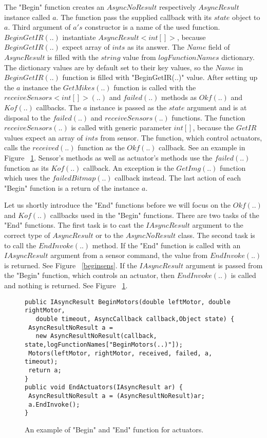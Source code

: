 	The "Begin" function creates an $AsyncNoResult$ respectively $AsyncResult$ instance called $a$. 
	The function pass the supplied callback with its $state$ object to
	$a$. Third argument of $a's$ constructor is a name of the used function.
	$BeginGetIR(..)$ instantiate $AsyncResult<int[]>$, because $BeginGetIR(..)$
	expect array of $ints$ as its answer. 
	The $Name$ field of $AsyncResult$ is filled with the $string$ value from $logFunctionNames$ dictionary. 
	The dictionary values are by default set to their key values, so
	the $Name$ in $BeginGetIR(..)$ function is filled with "BeginGetIR(..)" value.
	After setting up the $a$ instance the $GetMikes(..)$ function is called with the $receiveSensors<int[]>(..)$ and 
	$failed(..)$ methods as $Okf(..)$ and $Kof(..)$ callbacks.
	The $a$ instance is passed as the $state$ argument and is at disposal to the $failed(..)$ and 
	$receiveSensors(..)$ functions.
	The function $receiveSensors(..)$ is called with generic parameter $int[]$, 
	because the $GetIR$ values expect an array of $ints$ from sensor.
	The function, which control actuators, calls the $received(..)$ function as the $Okf(..)$ callback. 
	See an example in Figure ~\ref{beginact}.
	Sensor's methods as well as actuator's methods use the $failed(..)$ function as its $Kof(..)$ callback.
	An exception is the $GetImg(..)$ function which uses the $failedBitmap(..)$ callback instead.
	The last action of each "Begin" function is a return of the instance $a$.

	Let us shortly introduce the "End" functions before we will focus on the $Okf(..)$ and 
	$Kof(..)$ callbacks used in the "Begin" functions.
	There are two tasks of the "End" functions.
	The first task  is to cast the $IAsyncResult$ argument to the correct type of $AsyncResult$ 
	or to the $AsyncNoResult$ class. The second task is to call the $EndInvoke(..)$ method.
	If the "End" function is called with an $IAsyncResult$ argument from a sensor command, 
	the value from $EndInvoke(..)$ is returned. See Figure ~\ref{beginsens}. 
	If the $IAsyncResult$ argument is passed from the "Begin" function, 
	which controls an actuator, then $EndInvoke(..)$ is called and nothing is returned. See Figure ~\ref{beginact}.
	
\begin{figure}[!hbp]
\begin{lstlisting}
public IAsyncResult BeginMotors(double leftMotor, double rightMotor, 
   double timeout, AsyncCallback callback,Object state) {
 AsyncResultNoResult a = 
   new AsyncResultNoResult(callback, state,logFunctionNames["BeginMotors(..)"]);
 Motors(leftMotor, rightMotor, received, failed, a, timeout);
 return a;
}
public void EndActuators(IAsyncResult ar) {
 AsyncResultNoResult a = (AsyncResultNoResult)ar;
 a.EndInvoke();
}
\end{lstlisting}	
\caption{An example of "Begin" and "End" function for actuators.} \label{beginact}
\end{figure}
	
